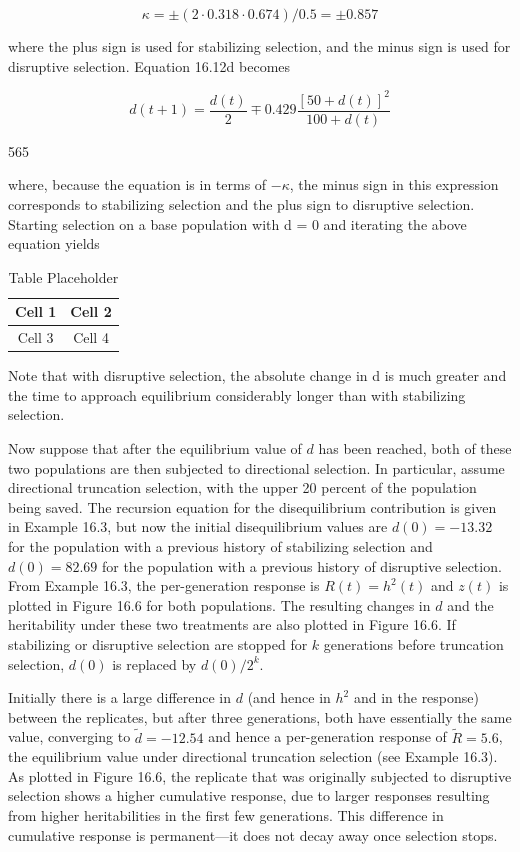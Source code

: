 \documentclass{article}
\begin{document}
\begin{equation}
\kappa=\pm(2\cdot0.318\cdot0.674)/0.5=\pm0.857
\end{equation}

where the plus sign is used for stabilizing selection, and the minus sign is used for disruptive selection. Equation 16.12d becomes

\begin{equation}
d(t+1)=\frac{d(t)}{2}\mp0.429\frac{\left[50+d(t)\right]^{2}}{100+d(t)}
\end{equation}

565

where, because the equation is in terms of  $ -\kappa $, the minus sign in this expression corresponds to stabilizing selection and the plus sign to disruptive selection. Starting selection on a base population with d = 0 and iterating the above equation yields

\begin{table}[h]
\centering
\begin{tabular}{|c|c|}
\hline
Cell 1 & Cell 2 \\
\hline
Cell 3 & Cell 4 \\
\hline
\end{tabular}
\caption{Table Placeholder}
\end{table}

Note that with disruptive selection, the absolute change in d is much greater and the time to approach equilibrium considerably longer than with stabilizing selection.

Now suppose that after the equilibrium value of $d$ has been reached, both of these two populations are then subjected to directional selection. In particular, assume directional truncation selection, with the upper 20 percent of the population being saved. The recursion equation for the disequilibrium contribution is given in Example 16.3, but now the initial disequilibrium values are $d(0) = -13.32$ for the population with a previous history of stabilizing selection and $d(0) = 82.69$ for the population with a previous history of disruptive selection. From Example 16.3, the per-generation response is $R(t) = h^2(t)$ and $z(t)$ is plotted in Figure 16.6 for both populations. The resulting changes in $d$ and the heritability under these two treatments are also plotted in Figure 16.6. If stabilizing or disruptive selection are stopped for $k$ generations before truncation selection, $d(0)$ is replaced by $d(0)/2^k$.

Initially there is a large difference in $d$ (and hence in $h^{2}$ and in the response) between the replicates, but after three generations, both have essentially the same value, converging to $\tilde{d} = -12.54$ and hence a per-generation response of $\tilde{R} = 5.6$, the equilibrium value under directional truncation selection (see Example 16.3). As plotted in Figure 16.6, the replicate that was originally subjected to disruptive selection shows a higher cumulative response, due to larger responses resulting from higher heritabilities in the first few generations. This difference in cumulative response is permanent—it does not decay away once selection stops.
\end{document}
